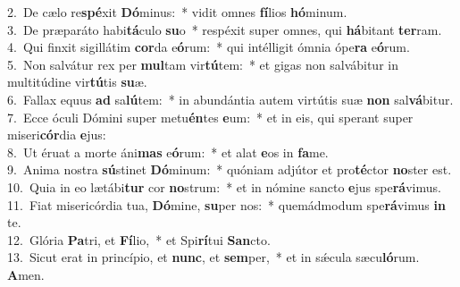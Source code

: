 {2.~}De cælo re\textbf{spé}xit \textbf{Dó}minus:~* vidit omnes \textbf{fí}lios \textbf{hó}minum.\\
{3.~}De præparáto habi\textbf{tá}culo \textbf{su}o~* respéxit super omnes, qui \textbf{há}bitant \textbf{ter}ram.\\
{4.~}Qui finxit sigillátim \textbf{cor}da e\textbf{ó}rum:~* qui intélligit ómnia ópe\textbf{ra} e\textbf{ó}rum.\\
{5.~}Non salvátur rex per \textbf{mul}tam vir\textbf{tú}tem:~* et gigas non salvábitur in multitúdine vir\textbf{tú}tis \textbf{su}æ.\\
{6.~}Fallax equus \textbf{ad} sa\textbf{lú}tem:~* in abundántia autem virtútis suæ \textbf{non} sal\textbf{vá}bitur.\\
{7.~}Ecce óculi Dómini super metu\textbf{én}tes \textbf{e}um:~* et in eis, qui sperant super miseri\textbf{cór}dia \textbf{e}jus:\\
{8.~}Ut éruat a morte áni\textbf{mas} e\textbf{ó}rum:~* et alat \textbf{e}os in \textbf{fa}me.\\
{9.~}Anima nostra \textbf{sú}stinet \textbf{Dó}minum:~* quóniam adjútor et pro\textbf{té}ctor \textbf{no}ster est.\\
{10.~}Quia in eo lætábi\textbf{tur} cor \textbf{no}strum:~* et in nómine sancto \textbf{e}jus spe\textbf{rá}vimus.\\
{11.~}Fiat misericórdia tua, \textbf{Dó}mine, \textbf{su}per nos:~* quemádmodum spe\textbf{rá}vimus \textbf{in} te.\\
{12.~}Glória \textbf{Pa}tri, et \textbf{Fí}lio,~* et Spi\textbf{rí}tui \textbf{San}cto.\\
{13.~}Sicut erat in princípio, et \textbf{nunc}, et \textbf{sem}per,~* et in sǽcula sæcu\textbf{ló}rum. \textbf{A}men.\\
